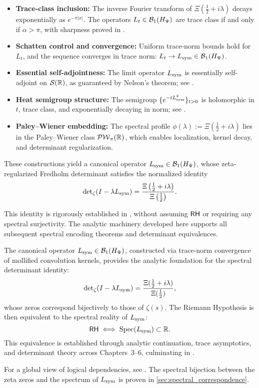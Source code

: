 \begin{itemize}
    \item \textbf{Trace-class inclusion:} The inverse Fourier transform of \( \Xi(\tfrac{1}{2} + i\lambda) \) decays exponentially as \( e^{-\pi|x|} \). The operators \( L_t \in \mathcal{B}_1(H_{\Psi}) \) are trace class if and only if \( \alpha > \pi \), with sharpness proved in .
    
    \item \textbf{Schatten control and convergence:} Uniform trace-norm bounds hold for \( L_t \), and the sequence converges in trace norm: \( L_t \to L_{\mathrm{sym}} \in \mathcal{B}_1(H_{\Psi}) \).
    
    \item \textbf{Essential self-adjointness:} The limit operator \( L_{\mathrm{sym}} \) is essentially self-adjoint on \( \mathcal{S}(\mathbb{R}) \), as guaranteed by Nelson's theorem; see .
    
    \item \textbf{Heat semigroup structure:} The semigroup \( \{e^{-t L_{\mathrm{sym}}^2}\}_{t > 0} \) is holomorphic in \( t \), trace class, and exponentially decaying in norm; see .
    
    \item \textbf{Paley--Wiener embedding:} The spectral profile \( \phi(\lambda) := \Xi(\tfrac{1}{2} + i\lambda) \) lies in the Paley--Wiener class \( \mathcal{PW}_{\pi}(\mathbb{R}) \), which enables localization, kernel decay, and determinant regularization.
\end{itemize}

These constructions yield a canonical operator \( L_{\mathrm{sym}} \in \mathcal{B}_1(H_{\Psi}) \), whose zeta-regularized Fredholm determinant satisfies the normalized identity
\[
\det\nolimits_{\zeta}(I - \lambda L_{\mathrm{sym}}) = \frac{\Xi\left(\tfrac{1}{2} + i\lambda\right)}{\Xi\left(\tfrac{1}{2}\right)}.
\]

This identity is rigorously established in , without assuming \( \mathsf{RH} \) or requiring any spectral surjectivity. The analytic machinery developed here supports all subsequent spectral encoding theorems and determinant equivalences.

\begin{tcolorbox}[colback=gray!2!white, colframe=black!50, title={\textbf{Outlook — RH via Spectral Reality}}]
The canonical operator \( L_{\mathrm{sym}} \in \mathcal{B}_1(H_{\Psi}) \), constructed via trace-norm convergence of mollified convolution kernels, provides the analytic foundation for the spectral determinant identity:
\[
\det\nolimits_{\zeta}(I - \lambda L_{\mathrm{sym}}) = \frac{\Xi(\tfrac{1}{2} + i\lambda)}{\Xi(\tfrac{1}{2})},
\]
whose zeros correspond bijectively to those of \( \zeta(s) \). The Riemann Hypothesis is then equivalent to the spectral reality of \( L_{\mathrm{sym}} \):
\[
\mathsf{RH} \iff \operatorname{Spec}(L_{\mathrm{sym}}) \subset \mathbb{R}.
\]
This equivalence is established through analytic continuation, trace asymptotics, and determinant theory across Chapters~3–6, culminating in .
\end{tcolorbox}

For a global view of logical dependencies, see . The spectral bijection between the zeta zeros and the spectrum of \( L_{\mathrm{sym}} \) is proven in \cref{sec:spectral_correspondence}.
